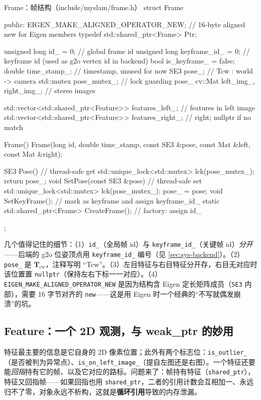 \begin{codebox}[C++]{Frame：帧结构（include/myslam/frame.h）}
struct Frame {
   public:
    EIGEN_MAKE_ALIGNED_OPERATOR_NEW;            // 16-byte aligned new for Eigen members
    typedef std::shared_ptr<Frame> Ptr;

    unsigned long id_ = 0;            // global frame id
    unsigned long keyframe_id_ = 0;  // keyframe id (used as g2o vertex id in backend)
    bool is_keyframe_ = false;
    double time_stamp_;              // timestamp, unused for now
    SE3 pose_;                       // Tcw : world -> camera
    std::mutex pose_mutex_;          // lock guarding pose_
    cv::Mat left_img_, right_img_;   // stereo images

    std::vector<std::shared_ptr<Feature>> features_left_;   // features in left image
    std::vector<std::shared_ptr<Feature>> features_right_;  // right; nullptr if no match

    Frame() {}
    Frame(long id, double time_stamp, const SE3 &pose, const Mat &left, const Mat &right);

    SE3 Pose() {                                 // thread-safe get
        std::unique_lock<std::mutex> lck(pose_mutex_);
        return pose_;
    }
    void SetPose(const SE3 &pose) {              // thread-safe set
        std::unique_lock<std::mutex> lck(pose_mutex_);
        pose_ = pose;
    }
    void SetKeyFrame();                          // mark as keyframe and assign keyframe_id_
    static std::shared_ptr<Frame> CreateFrame(); // factory: assign id_
};
\end{codebox}

\noindent 几个值得记住的细节：（1）\texttt{id\_}（全局帧 id）与 \texttt{keyframe\_id\_}（关键帧 id）\emph{分开}——后端的 g2o 位姿顶点用 \texttt{keyframe\_id\_} 编号（见 \cref{sec:sys-backend}）。（2）\texttt{pose\_} 是 $\mathbf{T}_{cw}$，注释写明 “Tcw”。（3）左目特征与右目特征分开存，右目无对应时该位置置 \texttt{nullptr}（保持左右下标一一对应）。（4）\verb|EIGEN_MAKE_ALIGNED_OPERATOR_NEW| 是因为结构含 Eigen 定长矩阵成员（\texttt{SE3} 内部），需要 16 字节对齐的 \texttt{new}——这是用 Eigen 时一个经典的“不写就偶发崩溃”的坑。

\subsection{Feature：一个 2D 观测，与 weak\_ptr 的妙用}
\label{sec:sys-feature}

特征最主要的信息是它自身的 2D 像素位置；此外有两个标志位：\texttt{is\_outlier\_}（是否被判为异常点）、\texttt{is\_on\_left\_image\_}（提自左图还是右图）。一个特征还要能\emph{回指}持有它的帧、以及它对应的路标。问题来了：帧持有特征（\texttt{shared\_ptr}），特征又回指帧——如果回指也用 \texttt{shared\_ptr}，二者的引用计数会互相加一、永远归不了零，对象永远不析构，这就是\textbf{循环引用}导致的内存泄漏。

